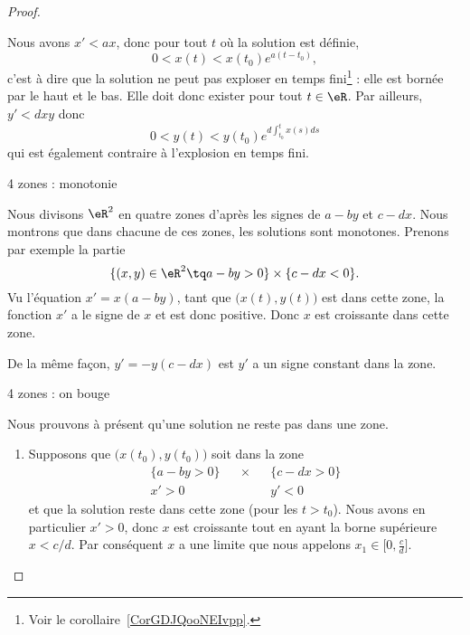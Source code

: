 \begin{proof}
\begin{subproof}
        Nous avons \( x'<ax\), donc pour tout \( t\) où la solution est définie,
        \begin{equation}
            0<x(t)<x(t_0) e^{a(t-t_0)},
        \end{equation}
        c'est à dire que la solution ne peut pas exploser en temps fini\footnote{Voir le corollaire~\ref{CorGDJQooNEIvpp}.} : elle est bornée par le haut et le bas. Elle doit donc exister pour tout \( t\in \eR\). Par ailleurs, \( y'<dxy\) donc
        \begin{equation}
            0<y(t)<y(t_0) e^{d\int_{t_0}^{t}x(s)ds}
        \end{equation}
        qui est également contraire à l'explosion en temps fini.

    \item[4 zones : monotonie]

        Nous divisons \( \eR^2\) en quatre zones d'après les signes de \( a-by\) et \( c-dx\). Nous montrons que dans chacune de ces zones, les solutions sont monotones. Prenons par exemple la partie
        \begin{equation}
            \{  (x,y)\in \eR^2\tq   a-by>0 \}\times\{ c-dx<0 \}.
        \end{equation}
        Vu l'équation \( x'=x(a-by)\), tant que \( \big( x(t),y(t) \big)\) est dans cette zone, la fonction \( x'\) a le signe de \( x\) et est donc positive. Donc \( x\) est croissante dans cette zone.

        De la même façon, \( y'=-y(c-dx)\) est \( y'\) a un signe constant dans la zone.

    \item[4 zones : on bouge]

        Nous prouvons à présent qu'une solution ne reste pas dans une zone.

        \begin{enumerate}
            \item
        Supposons que \( \big( x(t_0),y(t_0) \big) \) soit dans la zone
        \begin{subequations}
            \begin{align}
                \{ a-by>0 \}&&\times&& \{ c-dx>0 \}\\
                x'>0&&&&y'<0
            \end{align}
        \end{subequations}
        et que la solution reste dans cette zone (pour les \( t>t_0\)). Nous avons en particulier \( x'>0\), donc \( x\) est croissante tout en ayant la borne supérieure \(  x<c/d \). Par conséquent \( x\) a une limite que nous appelons \( x_1\in \mathopen[ 0 , \frac{ c }{ d } \mathclose]\).


\end{enumerate}
\end{subproof}
\end{proof}
